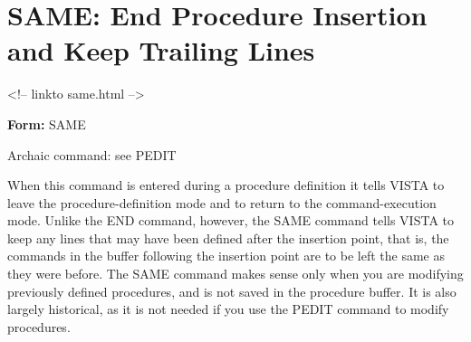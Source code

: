 \section{SAME: End Procedure Insertion and Keep Trailing Lines}
\begin{rawhtml}
<!-- linkto same.html -->
\end{rawhtml}

\begin{command} 
  \item[\textbf{Form: } SAME\hfill]{}
\end{command}

Archaic command: see PEDIT

When this command is entered during a procedure definition it tells VISTA
to leave the procedure-definition mode and to return to the
command-execution mode.  Unlike the END command, however, the SAME command
tells VISTA to keep any lines that may have been defined after the
insertion point, that is, the commands in the buffer following the
insertion point are to be left the same as they were before.  The SAME
command makes sense only when you are modifying previously defined
procedures, and is not saved in the procedure buffer. It is also largely
historical, as it is not needed if you use the PEDIT command to modify
procedures.

